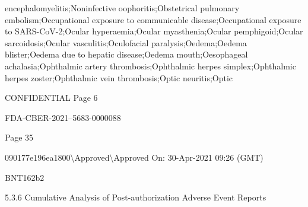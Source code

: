 \begin{refsection}
\begin{tcolorbox}[quote]
encephalomyelitis;Noninfective oophoritis;Obstetrical pulmonary embolism;Occupational exposure to communicable disease;Occupational exposure to SARS-CoV-2;Ocular hyperaemia;Ocular myasthenia;Ocular pemphigoid;Ocular sarcoidosis;Ocular vasculitis;Oculofacial paralysis;Oedema;Oedema blister;Oedema due to hepatic disease;Oedema mouth;Oesophageal achalasia;Ophthalmic artery thrombosis;Ophthalmic herpes simplex;Ophthalmic herpes zoster;Ophthalmic vein thrombosis;Optic neuritis;Optic

CONFIDENTIAL Page 6

FDA-CBER-2021--5683-0000088

Page 35

090177e196ea1800\textbackslash{}Approved\textbackslash{}Approved On: 30-Apr-2021 09:26 (GMT)

BNT162b2

5.3.6 Cumulative Analysis of Post-authorization Adverse Event Reports


\end{tcolorbox}
\end{refsection}
